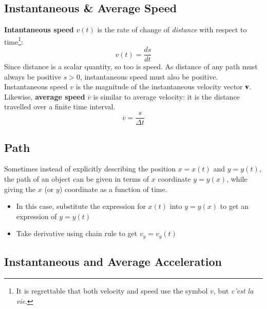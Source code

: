 \documentclass[11pt]{article}
\newcommand{\mb}[1]{\ensuremath\mathbf{#1}}
\begin{document}
\subsection{Instantaneous \& Average Speed}
\textbf{Intantaneous speed} $v(t)$ is the rate of change of \emph{distance}
with respect to time\footnote{It is regrettable that both velocity and speed
  use the symbol $v$, but \emph{c'est la vie}.}:
\begin{equation*}
  \boxed{v(t)=\frac{ds}{dt}}
\end{equation*}
Since distance is a scalar quantity, so too is speed. As distance of any path
must always be positive $s>0$, instantaneous speed must also be positive.
Instantaneous speed $v$ is the magnitude of the instantaneous velocity vector
$\mb{v}$. Likewise, \textbf{average speed} $\overline{v}$ is similar to average
velocity: it is the distance travelled over a finite time interval.
\begin{equation*}
  \boxed{\overline{v}=\frac{s}{\Delta t}}
\end{equation*}

\subsection{Path}
Sometimes instead of explicitly describing the position $x=x(t)$ and $y=y(t)$,
the path of an object can be given in terms of $x$ coordinate $y=y(x)$, while
giving the $x$ (or $y$) coordinate as a function of time.
\begin{itemize}
\item In this case, substitute the expression for $x(t)$ into $y=y(x)$ to
  get an expression of $y=y(t)$
\item Take derivative using chain rule to get $v_y=v_y(t)$
\end{itemize}


\subsection{Instantaneous and Average Acceleration}
\end{document}
